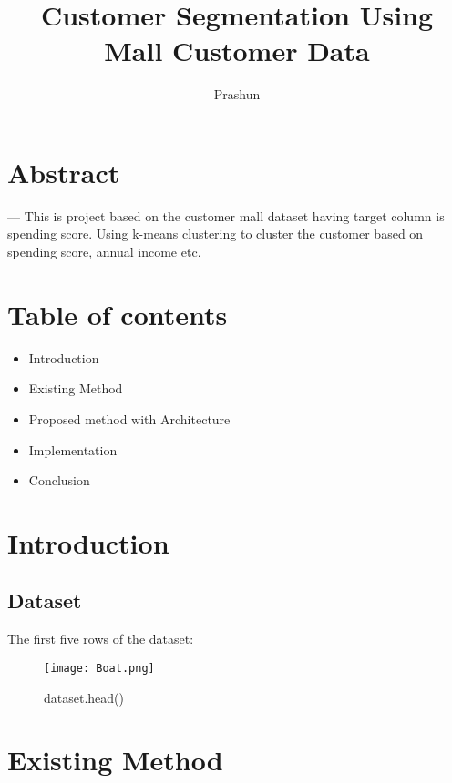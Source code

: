 \documentclass[conference]{IEEEtran}
\begin{document}
\onecolumn
\title{ Customer Segmentation Using Mall Customer Data}

\author{Prashun}

\maketitle

\section{\bf \large Abstract}---
This is project based on the customer mall dataset having target column is spending score. Using k-means clustering to cluster the customer based on spending score, annual income etc. 

\vspace{8mm}
\section{\bf \large Table of contents}
\begin{itemize}
\item Introduction
\item Existing Method
\item Proposed method with Architecture

\item Implementation
\item Conclusion

\end{itemize}

\section{\bf \large Introduction}

\subsection{Dataset}

The first five rows of the dataset:

\begin{figure}[h!]
  \texttt{[image: Boat.png]}
  \caption{dataset.head()}
  \label{fig 1}
\end{figure}
\newpage


\section{\bf Existing Method}
\end{document}
